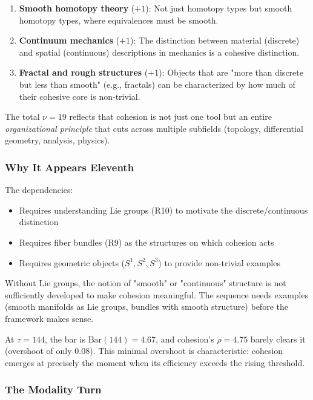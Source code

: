 \documentclass[11pt]{article}
\theoremstyle{definition}
\begin{document}
\begin{enumerate}
\item \textbf{Smooth homotopy theory} ($+1$): Not just homotopy types but smooth homotopy types, where equivalences must be smooth.

\item \textbf{Continuum mechanics} ($+1$): The distinction between material (discrete) and spatial (continuous) descriptions in mechanics is a cohesive distinction.

\item \textbf{Fractal and rough structures} ($+1$): Objects that are "more than discrete but less than smooth" (e.g., fractals) can be characterized by how much of their cohesive core is non-trivial.
\end{enumerate}

The total $\nu=19$ reflects that cohesion is not just one tool but an entire \emph{organizational principle} that cuts across multiple subfields (topology, differential geometry, analysis, physics).

\subsubsection{Why It Appears Eleventh}

The dependencies:
\begin{itemize}
\item Requires understanding Lie groups (R10) to motivate the discrete/continuous distinction
\item Requires fiber bundles (R9) as the structures on which cohesion acts
\item Requires geometric objects ($S^1, S^2, S^3$) to provide non-trivial examples
\end{itemize}

Without Lie groups, the notion of "smooth" or "continuous" structure is not sufficiently developed to make cohesion meaningful. The sequence needs examples (smooth manifolds as Lie groups, bundles with smooth structure) before the framework makes sense.

At $\tau=144$, the bar is $\text{Bar}(144) = 4.67$, and cohesion's $\rho=4.75$ barely clears it (overshoot of only $0.08$). This minimal overshoot is characteristic: cohesion emerges at precisely the moment when its efficiency exceeds the rising threshold.

\subsubsection{The Modality Turn}
\end{document}

